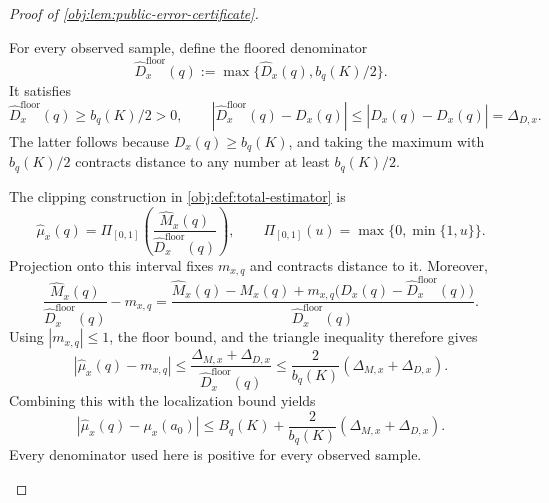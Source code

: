 \begin{proof}[Proof of \cref{obj:lem:public-error-certificate}]
\begin{enumerate}
For every observed sample, define the floored denominator
\[
\widehat D_x^{\mathrm{floor}}(q)
:=\max\{\widehat D_x(q),b_q(K)/2\}.
\]
It satisfies
\[
\widehat D_x^{\mathrm{floor}}(q)\ge b_q(K)/2>0,
\qquad
|\widehat D_x^{\mathrm{floor}}(q)-D_x(q)|
\le|\widehat D_x(q)-D_x(q)|=\Delta_{D,x}.
\]
The latter follows because \(D_x(q)\ge b_q(K)\), and taking the maximum
with \(b_q(K)/2\) contracts distance to any number at least \(b_q(K)/2\).

The clipping construction in \cref{obj:def:total-estimator} is
\[
\widehat\mu_x(q)
=\Pi_{[0,1]}
 \left(\frac{\widehat M_x(q)}
 {\widehat D_x^{\mathrm{floor}}(q)}\right),
\qquad
\Pi_{[0,1]}(u)=\max\{0,\min\{1,u\}\}.
\]
Projection onto this interval fixes \(m_{x,q}\) and contracts distance
to it. Moreover,
\[
\frac{\widehat M_x(q)}{\widehat D_x^{\mathrm{floor}}(q)}-m_{x,q}
=
\frac{\widehat M_x(q)-M_x(q)
      +m_{x,q}\bigl(D_x(q)-\widehat D_x^{\mathrm{floor}}(q)\bigr)}
     {\widehat D_x^{\mathrm{floor}}(q)}.
\]
Using \(|m_{x,q}|\le1\), the floor bound, and the triangle inequality
therefore gives
\[
|\widehat\mu_x(q)-m_{x,q}|
\le\frac{\Delta_{M,x}+\Delta_{D,x}}
          {\widehat D_x^{\mathrm{floor}}(q)}
\le\frac2{b_q(K)}(\Delta_{M,x}+\Delta_{D,x}).
\]
Combining this with the localization bound yields
\[
|\widehat\mu_x(q)-\mu_x(a_0)|
\le B_q(K)+\frac2{b_q(K)}(\Delta_{M,x}+\Delta_{D,x}).
\]
Every denominator used here is positive for every observed sample.


\end{enumerate}
\end{proof}

